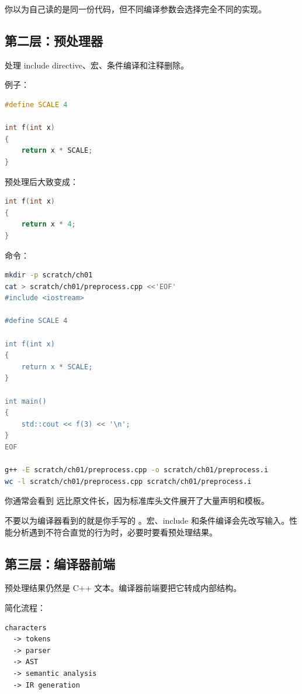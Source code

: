 你以为自己读的是同一份代码，但不同编译参数会选择完全不同的实现。

\subsection{第二层：预处理器}

 处理 include directive、宏、条件编译和注释删除。

例子：

\begin{lstlisting}[language=C++]
#define SCALE 4

int f(int x)
{
    return x * SCALE;
}
\end{lstlisting}

预处理后大致变成：

\begin{lstlisting}[language=C++]
int f(int x)
{
    return x * 4;
}
\end{lstlisting}

命令：

\begin{lstlisting}[language=bash]
mkdir -p scratch/ch01
cat > scratch/ch01/preprocess.cpp <<'EOF'
#include <iostream>

#define SCALE 4

int f(int x)
{
    return x * SCALE;
}

int main()
{
    std::cout << f(3) << '\n';
}
EOF

g++ -E scratch/ch01/preprocess.cpp -o scratch/ch01/preprocess.i
wc -l scratch/ch01/preprocess.cpp scratch/ch01/preprocess.i
\end{lstlisting}

你通常会看到  远比原文件长，因为标准库头文件展开了大量声明和模板。

\begin{warningbox}
不要以为编译器看到的就是你手写的 。宏、include 和条件编译会先改写输入。性能分析遇到不符合直觉的行为时，必要时要看预处理结果。
\end{warningbox}

\subsection{第三层：编译器前端}

预处理结果仍然是 C++ 文本。编译器前端要把它转成内部结构。

简化流程：

\begin{center}
\begin{minipage}{0.78\linewidth}
\begin{verbatim}
characters
  -> tokens
  -> parser
  -> AST
  -> semantic analysis
  -> IR generation
\end{verbatim}
\end{minipage}
\end{center}

